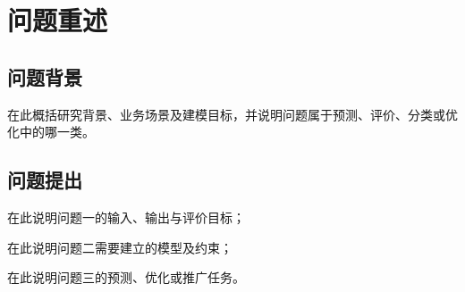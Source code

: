 \section{问题重述}

\subsection{问题背景}
在此概括研究背景、业务场景及建模目标，并说明问题属于预测、评价、分类或优化中的哪一类。

\subsection{问题提出}
\begin{problemlist}
  \item 在此说明问题一的输入、输出与评价目标；
  \item 在此说明问题二需要建立的模型及约束；
  \item 在此说明问题三的预测、优化或推广任务。
\end{problemlist}

